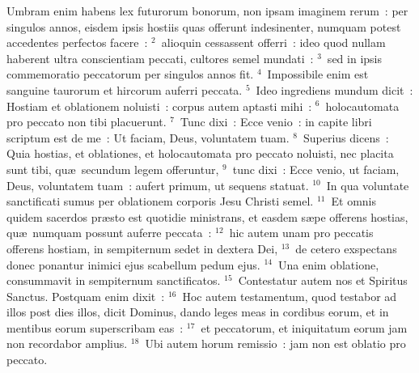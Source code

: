 \bchapter
\lettrine[lines=3,image=true,loversize=0.05,lraise=-0.03]{U}{}mbram enim habens lex futurorum bonorum, non ipsam imaginem rerum~: per singulos annos, eisdem ipsis hostiis quas offerunt indesinenter, numquam potest accedentes perfectos facere~:
${}^{2}$~alioquin cessassent offerri~: ideo quod nullam haberent ultra conscientiam peccati, cultores semel mundati~:
${}^{3}$~sed in ipsis commemoratio peccatorum per singulos annos fit.
${}^{4}$~Impossibile enim est sanguine taurorum et hircorum auferri peccata.
${}^{5}$~Ideo ingrediens mundum dicit~: Hostiam et oblationem noluisti~: corpus autem aptasti mihi~:
${}^{6}$~holocautomata pro peccato non tibi placuerunt.
${}^{7}$~Tunc dixi~: Ecce venio~: in capite libri scriptum est de me~: Ut faciam, Deus, voluntatem tuam.
${}^{8}$~Superius dicens~: Quia hostias, et oblationes, et holocautomata pro peccato noluisti, nec placita sunt tibi, qu\ae\ secundum legem offeruntur,
${}^{9}$~tunc dixi~: Ecce venio, ut faciam, Deus, voluntatem tuam~: aufert primum, ut sequens statuat.
${}^{10}$~In qua voluntate sanctificati sumus per oblationem corporis Jesu Christi semel.
${}^{11}$~Et omnis quidem sacerdos pr\ae sto est quotidie ministrans, et easdem s\ae pe offerens hostias, qu\ae\ numquam possunt auferre peccata~:
${}^{12}$~hic autem unam pro peccatis offerens hostiam, in sempiternum sedet in dextera Dei,
${}^{13}$~de cetero exspectans donec ponantur inimici ejus scabellum pedum ejus.
${}^{14}$~Una enim oblatione, consummavit in sempiternum sanctificatos.
${}^{15}$~Contestatur autem nos et Spiritus Sanctus. Postquam enim dixit~:
${}^{16}$~Hoc autem testamentum, quod testabor ad illos post dies illos, dicit Dominus, dando leges meas in cordibus eorum, et in mentibus eorum superscribam eas~:
${}^{17}$~et peccatorum, et iniquitatum eorum jam non recordabor amplius.
${}^{18}$~Ubi autem horum remissio~: jam non est oblatio pro peccato.


